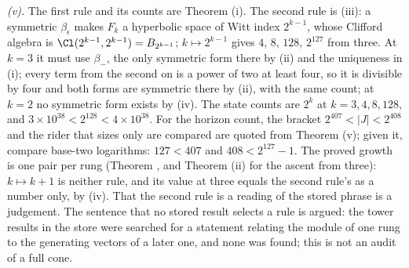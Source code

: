\emph{(v).} The first rule and its counts are Theorem (i). The second rule is (iii): a symmetric $\beta_{\epsilon}$ makes $F_{k}$ a hyperbolic space of Witt index $2^{k-1}$, whose Clifford algebra is $\Cl(2^{k-1}, 2^{k-1}) = B_{2^{k-1}}$; $k \mapsto 2^{k-1}$ gives $4$, $8$, $128$, $2^{127}$ from three. At $k = 3$ it must use $\beta_{-}$, the only symmetric form there by (ii) and the uniqueness in (i); every term from the second on is a power of two at least four, so it is divisible by four and both forms are symmetric there by (ii), with the same count; at $k = 2$ no symmetric form exists by (iv). The state counts are $2^{k}$ at $k = 3, 4, 8, 128$, and $3 \times 10^{38} < 2^{128} < 4 \times 10^{38}$. For the horizon count, the bracket $2^{407} < |J| < 2^{408}$ and the rider that sizes only are compared are quoted from Theorem (v); given it, compare base-two logarithms: $127 < 407$ and $408 < 2^{127} - 1$. The proved growth is one pair per rung (Theorem , and Theorem (ii) for the ascent from three): $k \mapsto k + 1$ is neither rule, and its value at three equals the second rule's as a number only, by (iv). That the second rule is a reading of the stored phrase is a judgement. The sentence that no stored result selects a rule is argued: the tower results in the store were searched for a statement relating the module of one rung to the generating vectors of a later one, and none was found; this is not an audit of a full cone.
